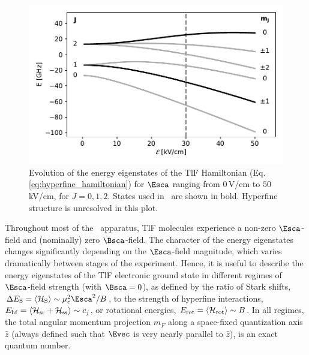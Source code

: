 \begin{figure}
	\centering
	\includegraphics[width=\textwidth/2]{figs/matplotlib/low_to_high_field.pdf}
	\caption{Evolution of the energy eigenstates of the TlF Hamiltonian (Eq. \ref{eq:hyperfine_hamiltonian}) for $\Esca$ ranging from $0\,$V/cm to $50\,$kV/cm, for $J=0,1,2$. States used in \CENTREX\ are shown in bold. Hyperfine structure is unresolved in this plot.}
	\label{fig:low_to_high_field}
\end{figure}

Throughout most of the \CENTREX\ apparatus, TlF molecules experience a non-zero $\Esca$-field and (nominally) zero $\Bsca$-field.
The character of the energy eigenstates changes significantly depending on the $\Esca$-field magnitude, which varies dramatically between stages of the experiment. Hence, it is useful to describe the energy eigenstates of the TlF electronic ground state in different regimes of $\Esca$-field strength (with $\Bsca = 0$), as defined by the ratio of Stark shifts, $\Delta E_{\rm S} = \langle \mathcal{H}_{\rm S}\rangle \sim \mu_e^2 \Esca^2/B$, to the strength of hyperfine interactions, $E_{\rm hf} = \langle \mathcal{H}_{\rm sr} + \mathcal{H}_{\rm ss}\rangle \sim c_j$, or rotational energies, $E_{\rm rot} = \langle \mathcal{H}_{\rm rot}\rangle \sim B$. In all regimes, the total angular momentum projection $m_F$ along 
a space-fixed quantization axis $\hat{z}$ (always defined such that $\Evec$ is very nearly parallel to $\hat{z}$), is an exact quantum number.

